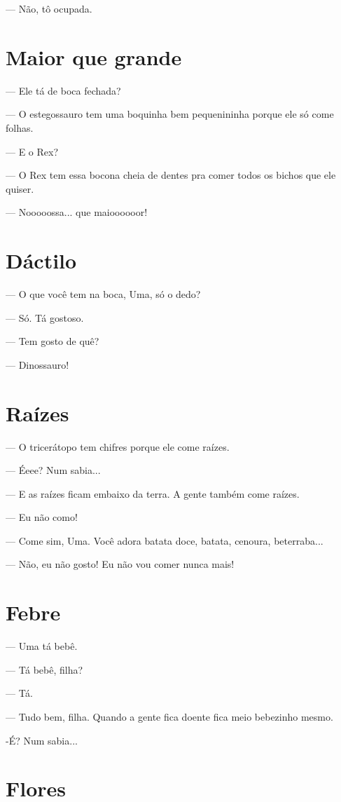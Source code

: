 — Não, tô ocupada.

\chapter{Maior que grande}

— Ele tá de boca fechada?

— O estegossauro tem uma boquinha bem pequenininha porque ele só come
folhas.

— E o Rex?

— O Rex tem essa bocona cheia de dentes pra comer todos os bichos que
ele quiser.

— Nooooossa... que maioooooor!

\chapter{Dáctilo}

— O que você tem na boca, Uma, só o dedo?

— Só. Tá gostoso.

— Tem gosto de quê?

— Dinossauro!

\chapter{Raízes}

— O tricerátopo tem chifres porque ele come raízes.

— Éeee? Num sabia...

— E as raízes ficam embaixo da terra. A gente também come raízes.

— Eu não como!

— Come sim, Uma. Você adora batata doce, batata, cenoura, beterraba...

— Não, eu não gosto! Eu não vou comer nunca mais!

\chapter{Febre}

— Uma tá bebê.

— Tá bebê, filha?

— Tá.

— Tudo bem, filha. Quando a gente fica doente fica meio bebezinho mesmo.

-É? Num sabia...

\chapter{Flores}

